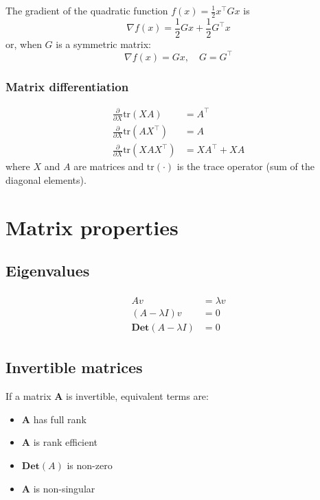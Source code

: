The gradient of the quadratic function $f(x) = \frac{1}{2}x^\top Gx$ is
$$
\nabla f(x) = \frac{1}{2}Gx + \frac{1}{2}G^\top x
$$
or, when $G$ is a symmetric matrix:
$$
\nabla f(x) = Gx,\quad G = G^\top
$$
\subsubsection{Matrix differentiation}
\begin{equation*}
    \begin{split}
        \frac{\partial }{\partial X}\text{tr}(XA)&=A^\top\\
        \frac{\partial }{\partial X}\text{tr}(AX^\top)&=A\\
        \frac{\partial }{\partial X}\text{tr}(XAX^\top)&=XA^\top+XA
    \end{split}
\end{equation*}
where $X$ and $A$ are matrices and $\text{tr}(\cdot)$ is the trace operator (sum of the diagonal elements).

\section{Matrix properties}

\subsection{Eigenvalues}
\begin{align}
    \begin{split}
        Av &= \lambda v
        \\
        (A-\lambda I)v &= 0
        \\
        \textbf{Det}(A-\lambda I) &= 0
    \end{split}
\end{align}

\subsection{Invertible matrices}
If a matrix $\mathbf{A}$ is invertible, equivalent terms are:
\begin{itemize}
    \item $\mathbf{A}$ has full rank
    \item $\mathbf{A}$ is rank efficient
    \item $\textbf{Det}(A)$ is non-zero
    \item $\mathbf{A}$ is non-singular
\end{itemize}

